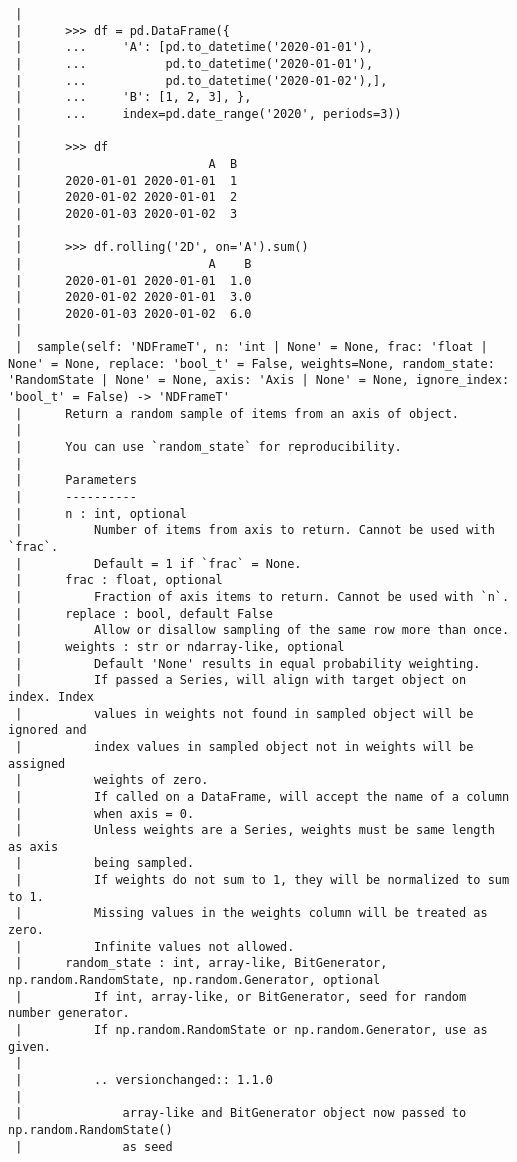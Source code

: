 \documentclass[
  letterpaper,
  DIV=11,
  numbers=noendperiod]{scrreprt}
\begin{document}
\begin{verbatim}
 |      
 |      >>> df = pd.DataFrame({
 |      ...     'A': [pd.to_datetime('2020-01-01'),
 |      ...           pd.to_datetime('2020-01-01'),
 |      ...           pd.to_datetime('2020-01-02'),],
 |      ...     'B': [1, 2, 3], },
 |      ...     index=pd.date_range('2020', periods=3))
 |      
 |      >>> df
 |                          A  B
 |      2020-01-01 2020-01-01  1
 |      2020-01-02 2020-01-01  2
 |      2020-01-03 2020-01-02  3
 |      
 |      >>> df.rolling('2D', on='A').sum()
 |                          A    B
 |      2020-01-01 2020-01-01  1.0
 |      2020-01-02 2020-01-01  3.0
 |      2020-01-03 2020-01-02  6.0
 |  
 |  sample(self: 'NDFrameT', n: 'int | None' = None, frac: 'float | None' = None, replace: 'bool_t' = False, weights=None, random_state: 'RandomState | None' = None, axis: 'Axis | None' = None, ignore_index: 'bool_t' = False) -> 'NDFrameT'
 |      Return a random sample of items from an axis of object.
 |      
 |      You can use `random_state` for reproducibility.
 |      
 |      Parameters
 |      ----------
 |      n : int, optional
 |          Number of items from axis to return. Cannot be used with `frac`.
 |          Default = 1 if `frac` = None.
 |      frac : float, optional
 |          Fraction of axis items to return. Cannot be used with `n`.
 |      replace : bool, default False
 |          Allow or disallow sampling of the same row more than once.
 |      weights : str or ndarray-like, optional
 |          Default 'None' results in equal probability weighting.
 |          If passed a Series, will align with target object on index. Index
 |          values in weights not found in sampled object will be ignored and
 |          index values in sampled object not in weights will be assigned
 |          weights of zero.
 |          If called on a DataFrame, will accept the name of a column
 |          when axis = 0.
 |          Unless weights are a Series, weights must be same length as axis
 |          being sampled.
 |          If weights do not sum to 1, they will be normalized to sum to 1.
 |          Missing values in the weights column will be treated as zero.
 |          Infinite values not allowed.
 |      random_state : int, array-like, BitGenerator, np.random.RandomState, np.random.Generator, optional
 |          If int, array-like, or BitGenerator, seed for random number generator.
 |          If np.random.RandomState or np.random.Generator, use as given.
 |      
 |          .. versionchanged:: 1.1.0
 |      
 |              array-like and BitGenerator object now passed to np.random.RandomState()
 |              as seed

\end{verbatim}
\end{document}
